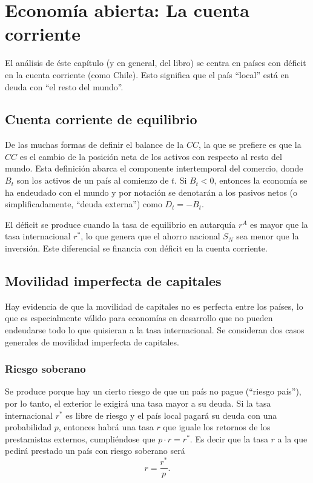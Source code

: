 \documentclass[DeGregorioResumen]{subfiles}
\begin{document}
\section{Economía abierta: La cuenta corriente}

El análisis de éste capítulo (y en general, del libro) se centra en países con déficit en la cuenta corriente (como Chile). Esto significa que el país ``local'' está en deuda con ``el resto del mundo''.

\subsection{Cuenta corriente de equilibrio}

De las muchas formas de definir el balance de la $CC$, la que se prefiere es que la $CC$ es el cambio de la posición neta de los activos con respecto al resto del mundo. Esta definición abarca el componente intertemporal del comercio, donde $B_t$ son los activos de un país al comienzo de $t$. Si $B_t<0$, entonces la economía se ha endeudado con el mundo y por notación se denotarán a los pasivos netos (o simplificadamente, ``deuda externa'') como $D_t=-B_t$.

El déficit se produce cuando la tasa de equilibrio en autarquía $r^A$ es mayor que la tasa internacional $r^*$, lo que genera que el ahorro nacional $S_N$ sea menor que la inversión. Este diferencial se financia con déficit en la cuenta corriente.



\subsection{Movilidad imperfecta de capitales}

Hay evidencia de que la movilidad de capitales no es perfecta entre los países, lo que es especialmente válido para economías en desarrollo que no pueden endeudarse todo lo que quisieran a la tasa internacional. Se consideran dos casos generales de movilidad imperfecta de capitales.

\subsubsection*{Riesgo soberano}
Se produce porque hay un cierto riesgo de que un país no pague (``riesgo país''), por lo tanto, el exterior le exigirá una tasa mayor a su deuda. Si la tasa internacional $r^*$ es libre de riesgo y el país local pagará su deuda con una probabilidad $p$, entonces habrá una tasa $r$ que iguale los retornos de los prestamistas externos, cumpliéndose que $p\cdot r = r^*$. Es decir que la tasa $r$ a la que pedirá prestado un país con riesgo soberano será
\begin{equation*}
r = \frac{r^*}{p}.
\end{equation*}
\end{document}
